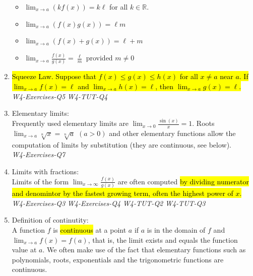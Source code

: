 \documentclass[10pt]{article}
\begin{document}
\begin{enumerate}
\begin{itemize}
  \item $\lim _{x \rightarrow a}(k f(x))=k \ell$ for all $k \in \mathbb{R}$.

  \item $\lim _{x \rightarrow a}(f(x) g(x))=\ell m$

  \item $\lim _{x \rightarrow a}(f(x)+g(x))=\ell+m$

  \item $\lim _{x \rightarrow a} \frac{f(x)}{g(x)}=\frac{\ell}{m}$ provided $m \neq 0$

\end{itemize}

\item \hl{Squeeze Law. Suppose that $f(x) \leq g(x) \leq h(x)$ for all $x \neq a$ near $a$. If $\lim _{x \rightarrow a} f(x)=\ell$ and $\lim _{x \rightarrow a} h(x)=\ell$, then $\lim _{x \rightarrow a} g(x)=\ell$.}\\
\textit{W4-Exercises-Q5}
\textit{W4-TUT-Q4}

\item Elementary limits:\\Frequently used elementary limits are $\lim _{x \rightarrow 0} \frac{\sin (x)}{x}=1$. Roots $\lim _{x \rightarrow a} \sqrt[n]{x}=\sqrt[n]{a}$ $(a>0)$ and other elementary functions allow the computation of limits by substitution (they are continuous, see below).\\
\textit{W4-Exercises-Q7}

\item Limits with fractions:\\Limits of the form $\lim _{x \rightarrow \infty} \frac{f(x)}{g(x)}$ are often computed \hl{by dividing numerator and denomintor by the fastest growing term, often the highest power of $x$.}\\
\textit{W4-Exercises-Q3}
\textit{W4-Exercises-Q4}
\textit{W4-TUT-Q2}
\textit{W4-TUT-Q3}

\newpage

\item Definition of continutity:\\A function $f$ is \hl{continuous} at a point $a$ if $a$ is in the domain of $f$ and $\lim _{x \rightarrow a} f(x)=f(a)$, that is, the limit exists and equals the function value at $a$. We often make use of the fact that elementary functions such as polynomials, roots, exponentials and the trigonometric functions are continuous.


\end{enumerate}
\end{document}
